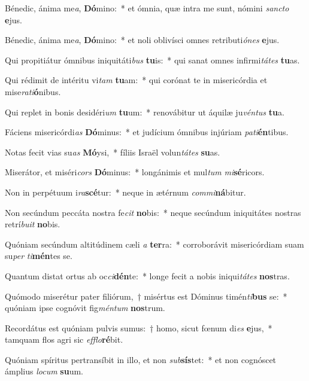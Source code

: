 \item Bénedic, ánima me\textit{a}, \textbf{Dó}mino:~* et ómnia, quæ intra me sunt, nómini \textit{sanc}\textit{to} \textbf{e}jus.
\item Bénedic, ánima me\textit{a}, \textbf{Dó}mino:~* et noli oblivísci omnes retributi\textit{ó}\textit{nes} \textbf{e}jus.
\item Qui propitiátur ómnibus iniquitáti\textit{bus} \textbf{tu}is:~* qui sanat omnes infirmi\textit{tá}\textit{tes} \textbf{tu}as.
\item Qui rédimit de intéritu vi\textit{tam} \textbf{tu}am:~* qui corónat te in misericórdia et mise\textit{ra}\textit{ti}\textbf{ó}nibus.
\item Qui replet in bonis desidéri\textit{um} \textbf{tu}um:~* renovábitur ut áquilæ ju\textit{vén}\textit{tus} \textbf{tu}a.
\item Fáciens misericórdi\textit{as} \textbf{Dó}minus:~* et judícium ómnibus injúriam \textit{pa}\textit{ti}\textbf{én}tibus.
\item Notas fecit vias su\textit{as} \textbf{Mó}ysi,~* fíliis Israël volun\textit{tá}\textit{tes} \textbf{su}as.
\item Miserátor, et miséri\textit{cors} \textbf{Dó}minus:~* longánimis et mul\textit{tum} \textit{mi}\textbf{sé}ricors.
\item Non in perpétuum i\textit{ra}\textbf{scé}tur:~* neque in ætérnum \textit{com}\textit{mi}\textbf{ná}bi\-tur.
\item Non secúndum peccáta nostra fe\textit{cit} \textbf{no}bis:~* neque secúndum iniquitátes nostras retrí\textit{bu}\textit{it} \textbf{no}bis.
\item Quóniam secúndum altitúdinem cæli \textit{a} \textbf{ter}ra:~* corroborávit misericórdiam suam su\textit{per} \textit{ti}\textbf{mén}tes se.
\item Quantum distat ortus ab oc\textit{ci}\textbf{dén}te:~* longe fecit a nobis iniqui\textit{tá}\textit{tes} \textbf{nos}tras.
\item Quómodo miserétur pater filiórum,~† misértus est Dóminus timén\textit{ti}\textbf{bus} se:~* quóniam ipse cognóvit fig\textit{mén}\textit{tum} \textbf{nos}trum.
\item Recordátus est quóniam pulvis sumus:~† homo, sicut fœnum di\textit{es} \textbf{e}jus,~* tamquam flos agri sic \textit{ef}\textit{flo}\textbf{ré}bit.
\item Quóniam spíritus pertransíbit in illo, et non \textit{sub}\textbf{sís}tet:~* et non cognóscet ámplius \textit{lo}\textit{cum} \textbf{su}um.
